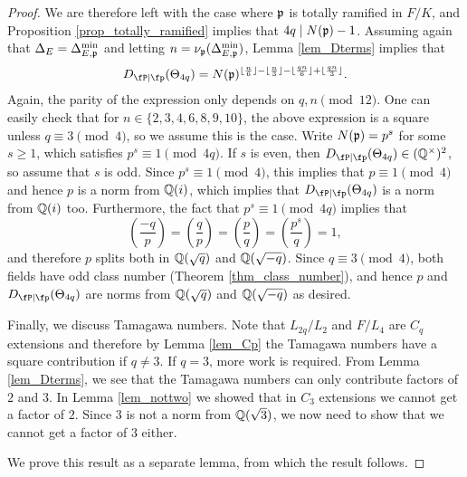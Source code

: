 \begin{proof}
    We are therefore left with the case where $\mathfrak{p}$ is totally ramified in $F/K$, and Proposition \ref{prop_totally_ramified} implies that $4q\mid N(\mathfrak{p})-1$. Assuming again that $\Delta_E=\Delta_{E,\mathfrak{p}}^{\min}$ and letting $n=\nu_{\mathfrak{p}}(\Delta_{E,\mathfrak{p}}^{\min})$, Lemma \ref{lem_Dterms} implies that 
    $$\Dp(\Theta_{4q})=N(\pp)^{\floor{\frac{n}{6}}-\floor{\frac{n}{3}}-\floor{\frac{qn}{6}}+\floor{\frac{qn}{3}}}.$$
    Again, the parity of the expression only depends on $q,n\pmod{12}$. One can easily check that for $n\in\{2,3,4,6,8,9,10\}$, the above expression is a square unless $q\equiv 3\pmod{4}$, so we assume this is the case. Write $N(\mathfrak{p})=p^s$ for some $s\geq1$, which satisfies $p^s\equiv1\pmod{4q}$. If $s$ is even, then $\Dp(\Theta_{4q})\in\QQss$, so assume that $s$ is odd. Since $p^s\equiv1\pmod{4}$, this implies that $p\equiv1\pmod{4}$ and hence $p$ is a norm from $\mathbb{Q}(i)$, which implies that $\Dp(\Theta_{4q})$ is a norm from $\mathbb{Q}(i)$ too. Furthermore, the fact that $p^s\equiv1\pmod{4q}$ implies that
    $$\left(\frac{-q}{p}\right)=\left(\frac{q}{p}\right)=\left(\frac{p}{q}\right)=\left(\frac{p^s}{q}\right)=1,$$
    and therefore $p$ splits both in $\mathbb{Q}(\sqrt{q})$ and $\mathbb{Q}(\sqrt{-q})$. Since $q\equiv3\pmod{4}$, both fields have odd class number (Theorem \ref{thm_class_number}), and hence $p$ and $\Dp(\Theta_{4q})$ are norms from $\mathbb{Q}(\sqrt{q})$ and $\mathbb{Q}(\sqrt{-q})$ as desired. 

    Finally, we discuss Tamagawa numbers. Note that $L_{2q}/L_2$ and $F/L_4$ are $C_q$ extensions and therefore by Lemma \ref{lem_Cp} the Tamagawa numbers have a square contribution if $q\neq3$. If $q=3$, more work is required. From Lemma \ref{lem_Dterms}, we see that the Tamagawa numbers can only contribute factors of $2$ and $3$. In Lemma \ref{lem_nottwo} we showed that in $C_3$ extensions we cannot get a factor of $2$. Since $3$ is not a norm from $\mathbb{Q}(\sqrt{3})$, we now need to show that we cannot get a factor of $3$ either. 
    
    We prove this result as a separate lemma, from which the result follows.    
\end{proof}

